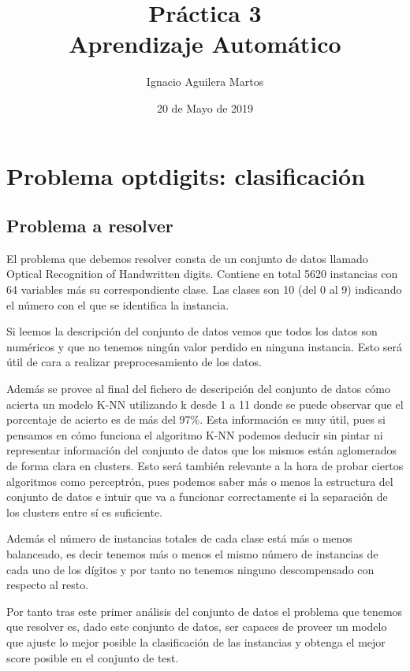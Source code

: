 \documentclass[12pt,a4paper]{article}
\author{Ignacio Aguilera Martos}
\title{Práctica 3 \\ Aprendizaje Automático}
\date{20 de Mayo de 2019}
\begin{document}
	\maketitle

	\tableofcontents

	\newpage
	
\section{Problema optdigits: clasificación}

\subsection{Problema a resolver}

El problema que debemos resolver consta de un conjunto de datos llamado Optical Recognition of Handwritten digits. Contiene en total 5620 instancias con 64 variables más su correspondiente clase. Las clases son 10 (del 0 al 9) indicando el número con el que se identifica la instancia.

Si leemos la descripción del conjunto de datos vemos que todos los datos son numéricos y que no tenemos ningún valor perdido en ninguna instancia. Esto será útil de cara a realizar preprocesamiento de los datos.

Además se provee al final del fichero de descripción del conjunto de datos cómo acierta un modelo K-NN utilizando k desde 1 a 11 donde se puede observar que el porcentaje de acierto es de más del 97\%. Esta información es muy útil, pues si pensamos en cómo funciona el algoritmo K-NN podemos deducir sin pintar ni representar información del conjunto de datos que los mismos están aglomerados de forma clara en clusters. Esto será también relevante a la hora de probar ciertos algoritmos como perceptrón, pues podemos saber más o menos la estructura del conjunto de datos e intuir que va a funcionar correctamente si la separación de los clusters entre sí es suficiente.

Además el número de instancias totales de cada clase está más o menos balanceado, es decir tenemos más o menos el mismo número de instancias de cada uno de los dígitos y por tanto no tenemos ninguno descompensado con respecto al resto.

Por tanto tras este primer análisis del conjunto de datos el problema que tenemos que resolver es, dado este conjunto de datos, ser capaces de proveer un modelo que ajuste lo mejor posible la clasificación de las instancias y obtenga el mejor score posible en el conjunto de test.
\end{document}
